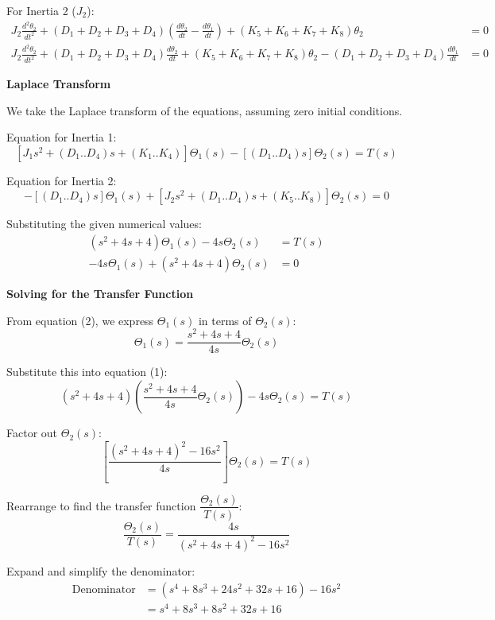 \documentclass[11pt]{article}
\begin{document}
{For Inertia 2 ($J_2$):}
\begin{align*}
    J_2 \frac{d^2\theta_2}{dt^2} + (D_1+D_2+D_3+D_4)\left(\frac{d\theta_2}{dt} - \frac{d\theta_1}{dt}\right) + (K_5+K_6+K_7+K_8)\theta_2 &= 0 \\
    J_2 \frac{d^2\theta_2}{dt^2} + (D_1+D_2+D_3+D_4)\frac{d\theta_2}{dt} + (K_5+K_6+K_7+K_8)\theta_2 - (D_1+D_2+D_3+D_4)\frac{d\theta_1}{dt} &= 0
\end{align*}

\newpage
\noindent\textbf{Laplace Transform}

\vspace{12pt}

We take the Laplace transform of the equations, assuming zero initial conditions.

\vspace{8pt}

Equation for Inertia 1:
\[
[J_1 s^2 + (D_1..D_4)s + (K_1..K_4)]\Theta_1(s) - [(D_1..D_4)s]\Theta_2(s) = T(s)
\]

Equation for Inertia 2:
\[
-[(D_1..D_4)s]\Theta_1(s) + [J_2 s^2 + (D_1..D_4)s + (K_5..K_8)]\Theta_2(s) = 0
\]

Substituting the given numerical values:
\begin{align}
    (s^2 + 4s + 4)\Theta_1(s) - 4s\Theta_2(s) &= T(s) \tag{1} \\
    -4s\Theta_1(s) + (s^2 + 4s + 4)\Theta_2(s) &= 0 \tag{2}
\end{align}

\noindent\textbf{Solving for the Transfer Function}
\vspace{8pt}

From equation (2), we express $\Theta_1(s)$ in terms of $\Theta_2(s)$:
\[
\Theta_1(s) = \frac{s^2 + 4s + 4}{4s} \Theta_2(s)
\]

Substitute this into equation (1):
\[
(s^2 + 4s + 4) \left( \frac{s^2 + 4s + 4}{4s} \Theta_2(s) \right) - 4s\Theta_2(s) = T(s)
\]

Factor out $\Theta_2(s)$:
\[
\left[ \frac{(s^2 + 4s + 4)^2 - 16s^2}{4s} \right] \Theta_2(s) = T(s)
\]

Rearrange to find the transfer function $\dfrac{\Theta_2(s)}{T(s)}$:
\[
\frac{\Theta_2(s)}{T(s)} = \frac{4s}{(s^2 + 4s + 4)^2 - 16s^2}
\]

Expand and simplify the denominator:
\begin{align*}
    \text{Denominator} &= (s^4 + 8s^3 + 24s^2 + 32s + 16) - 16s^2 \\
    &= s^4 + 8s^3 + 8s^2 + 32s + 16
\end{align*}
\end{document}
